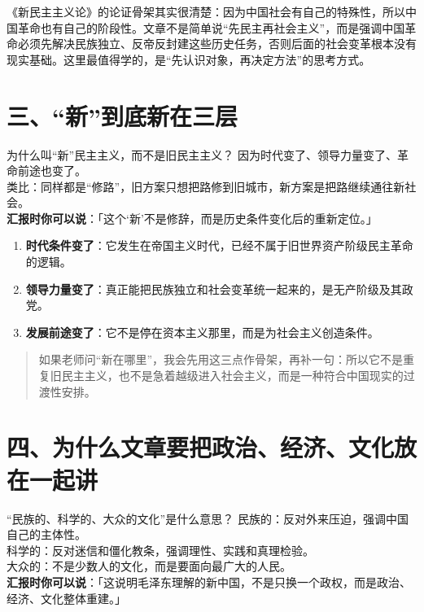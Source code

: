 \documentclass[12pt,a4paper,landscape]{article}
\begin{document}
《新民主主义论》的论证骨架其实很清楚：因为中国社会有自己的特殊性，所以中国革命也有自己的阶段性。文章不是简单说“先民主再社会主义”，而是强调中国革命必须先解决民族独立、反帝反封建这些历史任务，否则后面的社会变革根本没有现实基础。这里最值得学的，是“先认识对象，再决定方法”的思考方式。

\section*{三、“新”到底新在三层}

\begin{termbox}{为什么叫“新”民主主义，而不是旧民主主义？}
因为时代变了、领导力量变了、革命前途也变了。\\[2pt]
类比：同样都是“修路”，旧方案只想把路修到旧城市，新方案是把路继续通往新社会。\\[2pt]
\textbf{汇报时你可以说}：「这个‘新’不是修辞，而是历史条件变化后的重新定位。」
\end{termbox}

\begin{enumerate}[leftmargin=2em]
  \item \textbf{时代条件变了}：它发生在帝国主义时代，已经不属于旧世界资产阶级民主革命的逻辑。
  \item \textbf{领导力量变了}：真正能把民族独立和社会变革统一起来的，是无产阶级及其政党。
  \item \textbf{发展前途变了}：它不是停在资本主义那里，而是为社会主义创造条件。
\end{enumerate}

\begin{quote}\kaishu
如果老师问“新在哪里”，我会先用这三点作骨架，再补一句：所以它不是重复旧民主主义，也不是急着越级进入社会主义，而是一种符合中国现实的过渡性安排。
\end{quote}

\section*{四、为什么文章要把政治、经济、文化放在一起讲}

\begin{termbox}{“民族的、科学的、大众的文化”是什么意思？}
民族的：反对外来压迫，强调中国自己的主体性。\\
科学的：反对迷信和僵化教条，强调理性、实践和真理检验。\\
大众的：不是少数人的文化，而是要面向最广大的人民。\\[2pt]
\textbf{汇报时你可以说}：「这说明毛泽东理解的新中国，不是只换一个政权，而是政治、经济、文化整体重建。」
\end{termbox}
\end{document}
